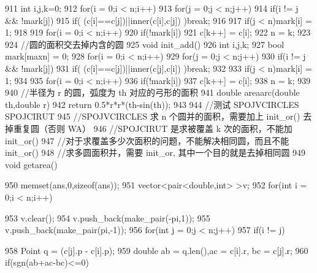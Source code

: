 \documentclass[11pt]{article}
\begin{document}
\begin{Code}
{{911              int i,j,k=0;
912              for(i = 0;i < n;i++){
913                  for(j = 0;j < n;j++)
914                      if(i != j && !mark[j]){
915                          if( (c[i]==c[j])||inner(c[i],c[j]) )break;
916                      }
917                  if(j < n)mark[i] = 1;
918              }
919              for(i = 0;i < n;i++)
920                  if(!mark[i])
921                      c[k++] = c[i];
922              n = k;
923       }
924       //圆的面积交去掉内含的圆
925       void init_add(){
926           int i,j,k;
927           bool mark[maxn] = {0};
928           for(i = 0;i < n;i++){
929               for(j = 0;j < n;j++)
930                   if(i != j && !mark[j]){
931                       if( (c[i]==c[j])||inner(c[j],c[i]) )break;
932                   }
933               if(j < n)mark[i] = 1;
934           }
935           for(i = 0;i < n;i++)
936               if(!mark[i])
937                   c[k++] = c[i];
938           n = k;
939       }
940       //半径为 r 的圆，弧度为 th 对应的弓形的面积
941       double areaarc(double th,double r){
942           return 0.5*r*r*(th-sin(th));
943       }
944       //测试 SPOJVCIRCLES SPOJCIRUT
945       //SPOJVCIRCLES 求 n 个圆并的面积，需要加上 init_or() 去掉重复圆（否则
             WA）
946       //SPOJCIRUT 是求被覆盖 k 次的面积，不能加 init_or()
947       //对于求覆盖多少次面积的问题，不能解决相同圆，而且不能 init_or()
948       //求多圆面积并，需要 init_or, 其中一个目的就是去掉相同圆
949       void getarea(){
950           memset(ans,0,sizeof(ans));
951           vector<pair<double,int> >v;
952           for(int i = 0;i < n;i++){
953               v.clear();
954               v.push_back(make_pair(-pi,1));
955               v.push_back(make_pair(pi,-1));
956               for(int j = 0;j < n;j++)
957                   if(i != j){
958                       Point q = (c[j].p - c[i].p);
959                       double ab = q.len(),ac = c[i].r, bc = c[j].r;
960                       if(sgn(ab+ac-bc)<=0){


}}}}}
\end{Code}
\end{document}

